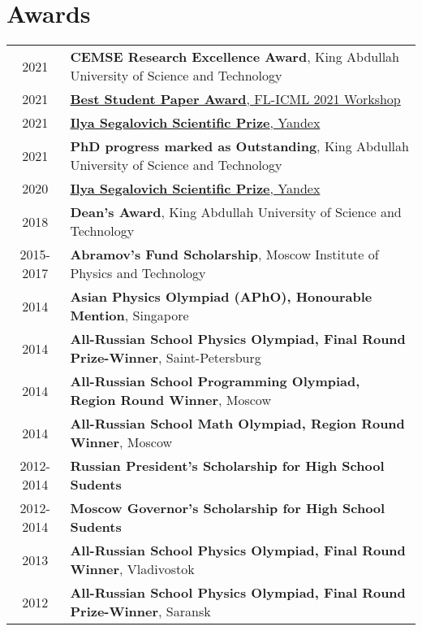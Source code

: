\section{Awards}
\hypersetup{colorlinks,breaklinks,urlcolor=black,linkcolor=black}
\begin{tabularx}{\textwidth}{cX}
	\textsc{2021} & \textbf{CEMSE Research Excellence Award}, King Abdullah University of Science and Technology\\
	\textsc{2021} & \href{http://federated-learning.org/fl-icml-2021/}{\textbf{Best Student Paper Award}, FL-ICML 2021 Workshop}\\
	\textsc{2021} & \href{https://yandex.ru/scholarships/scholars}{\textbf{Ilya Segalovich Scientific Prize}, Yandex} \\
	\textsc{2021} & {\bf PhD progress marked as Outstanding}, King Abdullah University of Science and Technology\\
	\textsc{2020} & \href{https://yandex.ru/scholarships/scholars}{\textbf{Ilya Segalovich Scientific Prize}, Yandex}\\
	\textsc{2018} & {\bf Dean's Award}, King Abdullah University of Science and Technology\\
	\textsc{2015-2017} & \textbf{Abramov’s Fund Scholarship}, Moscow Institute of Physics and Technology\\
	\textsc{2014} & \textbf{Asian Physics Olympiad (APhO), Honourable Mention}, Singapore\\
	\textsc{2014} & \textbf{All-Russian School Physics Olympiad, Final Round Prize-Winner}, Saint-Petersburg\\
	\textsc{2014} & \textbf{All-Russian School Programming Olympiad, Region Round Winner}, Moscow\\
	\textsc{2014} & \textbf{All-Russian School Math Olympiad, Region Round Winner}, Moscow\\
	\textsc{2012-2014} & \textbf{Russian President’s Scholarship for High School Sudents}\\
	\textsc{2012-2014} & \textbf{Moscow Governor’s Scholarship for High School Sudents}\\
	\textsc{2013} & \textbf{All-Russian School Physics Olympiad, Final Round Winner}, Vladivostok\\
	\textsc{2012} & \textbf{All-Russian School Physics Olympiad, Final Round Prize-Winner}, Saransk\\
\end{tabularx}
\hypersetup{colorlinks,breaklinks,urlcolor=linkcolour,linkcolor=linkcolour}

